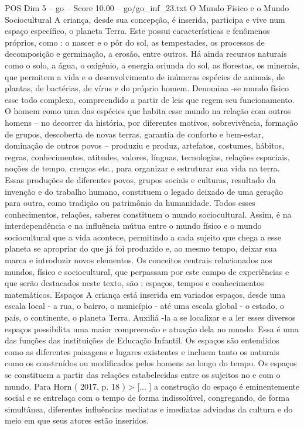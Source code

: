 \begin{textsample}{POS Dim 5 – go – Score 10.00 – go/go\_inf\_23.txt}
O Mundo Físico e o Mundo Sociocultural A criança, desde sua concepção, é inserida, participa e vive num espaço específico, o planeta Terra.
Este possui características e fenômenos próprios, como : o nascer e o pôr do sol, as tempestades, os processos de decomposição e germinação, a erosão, entre outros.
Há ainda recursos naturais como o solo, a água, o oxigênio, a energia oriunda do sol, as florestas, os minerais, que permitem a vida e o desenvolvimento de inúmeras espécies de animais, de plantas, de bactérias, de vírus e do próprio homem.
Denomina -se mundo físico esse todo complexo, compreendido a partir de leis que regem seu funcionamento.
O homem como uma das espécies que habita esse mundo na relação com outros homens – no decorrer da história, por diferentes motivos, sobrevivência, formação de grupos, descoberta de novas terras, garantia de conforto e bem-estar, dominação de outros povos – produziu e produz, artefatos, costumes, hábitos, regras, conhecimentos, atitudes, valores, línguas, tecnologias, relações espaciais, noções de tempo, crenças etc., para organizar e estruturar sua vida na terra.
Essas produções de diferentes povos, grupos sociais e culturas, resultado da invenção e do trabalho humano, constituem o legado deixado de uma geração para outra, como tradição ou patrimônio da humanidade.
Todos esses conhecimentos, relações, saberes constituem o mundo sociocultural.
Assim, é na interdependência e na influência mútua entre o mundo físico e o mundo sociocultural que a vida acontece, permitindo a cada sujeito que chega a esse planeta se apropriar do que já foi produzido e, ao mesmo tempo, deixar sua marca e introduzir novos elementos.
Os conceitos centrais relacionados aos mundos, físico e sociocultural, que perpassam por este campo de experiências e que serão destacados neste texto, são : espaços, tempos e conhecimentos matemáticos.
Espaços A criança está inserida em variados espaços, desde uma escala local - a rua, o bairro, o município - até uma escala global - o estado, o país, o continente, o planeta Terra.
Auxiliá -la a se localizar e a ler esses diversos espaços possibilita uma maior compreensão e atuação dela no mundo.
Essa é uma das funções das instituições de Educação Infantil.
Os espaços são entendidos como as diferentes paisagens e lugares existentes e incluem tanto os naturais como os construídos ou modificados pelos homens ao longo do tempo.
Os espaços se constituem a partir das relações estabelecidas entre os sujeitos no e com o mundo.
Para Horn ( 2017, p. 18 ) > [... ] a construção do espaço é eminentemente social e se entrelaça com o tempo de forma indissolúvel, congregando, de forma simultânea, diferentes influências mediatas e imediatas advindas da cultura e do meio em que seus atores estão inseridos.

\end{textsample}
